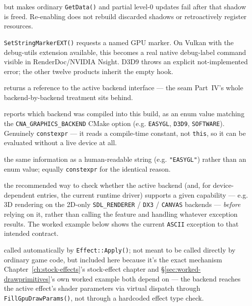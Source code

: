 \begin{description}
  but makes ordinary \texttt{GetData()} and partial level-0 updates fail after that shadow is
  freed. Re-enabling does not rebuild discarded shadows or retroactively register resources.
\item[Debug marker] \texttt{SetStringMarkerEXT()} requests a named GPU marker. On Vulkan with
  the debug-utils extension available, this becomes a real native debug-label command visible
  in RenderDoc/NVIDIA Nsight. D3D9 throws an explicit not-implemented error; the other twelve
  products inherit the empty hook.
\item[\texttt{IGraphicsBackend\& GetBackend() const}] returns a reference to the active backend
  interface --- the seam Part~IV's whole backend-by-backend treatment sits behind.
\item[\texttt{constexpr CNA::GraphicsBackendType GetGraphicsBackendType() const}] reports which
  backend was compiled into this build, as an enum value matching the
  \texttt{CNA\_GRAPHICS\_BACKEND} CMake option (e.g. \texttt{EASYGL}, \texttt{D3D9},
  \texttt{SOFTWARE}). Genuinely \texttt{constexpr} --- it reads a compile-time constant, not
  \texttt{this}, so it can be evaluated without a live device at all.
\item[\texttt{constexpr std::string\_view GetGraphicsBackendName() const}] the same information
  as a human-readable string (e.g. \texttt{"EASYGL"}) rather than an enum value; equally
  \texttt{constexpr} for the identical reason.
\item[\texttt{bool SupportsCapability(CNA::GraphicsCapability capability) const}] the
  recommended way to check whether the active backend (and, for device-dependent entries, the
  current runtime driver) supports a given capability --- e.g. 3D rendering on the 2D-only
  \texttt{SDL\_RENDERER} / \texttt{DX3} / \texttt{CANVAS} backends --- \emph{before} relying on it,
  rather than calling the feature and handling whatever exception results. The worked example
  below shows the current \texttt{ASCII} exception to that intended contract.
\item[\texttt{void SetCurrentEffect(Effect* effect)}] called automatically by
  \texttt{Effect::Apply()}; not meant to be called directly by ordinary game code, but included
  here because it's the exact mechanism Chapter~\ref{ch:stock-effects}'s stock-effect chapter
  and \S\ref{sec:worked-drawprimitives}'s own worked example both depend on --- the backend
  reaches the active effect's shader parameters via virtual dispatch through
  \texttt{FillGpuDrawParams()}, not through a hardcoded effect type check.

\end{description}
